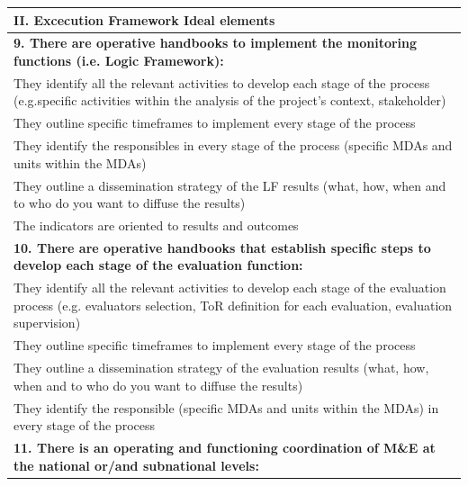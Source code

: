 \documentclass[
  10pt,
]{book}
\begin{document}
\begin{table}
\centering
\begin{tabular}[t]{l}
\hline
II. Excecution Framework Ideal elements\\
\hline
\multicolumn{1}{l}{\textbf{9. There are operative handbooks to implement the monitoring functions (i.e. Logic Framework):}}\\
\hline
\hspace{1em}They identify all the relevant activities to develop each stage of the process (e.g.specific activities within the analysis of the project's context, stakeholder)\\
\hline
\hspace{1em}They outline specific timeframes to implement every stage of the \vphantom{1} process\\
\hline
\hspace{1em}They identify the responsibles in every stage of the process (specific MDAs and units within the MDAs)\\
\hline
\hspace{1em}They outline a dissemination strategy of the LF results (what, how, when and to who do you want to diffuse the results)\\
\hline
\hspace{1em}The indicators are oriented to results and outcomes\\
\hline
\multicolumn{1}{l}{\textbf{10. There are operative handbooks that establish specific steps to develop each stage of the evaluation function:}}\\
\hline
\hspace{1em}They identify all the relevant activities to develop each stage of the evaluation process (e.g. evaluators selection, ToR definition for each evaluation, evaluation supervision)\\
\hline
\hspace{1em}They outline specific timeframes to implement every stage of the process\\
\hline
\hspace{1em}They outline a dissemination strategy of the evaluation results (what, how, when and to who do you want to diffuse the results)\\
\hline
\hspace{1em}They identify the responsible (specific MDAs and units within the MDAs)  in every stage of the process\\
\hline
\multicolumn{1}{l}{\textbf{11. There is an operating and functioning coordination of M\&E at the national or/and subnational levels:}}\\

\end{tabular}
\end{table}
\end{document}
